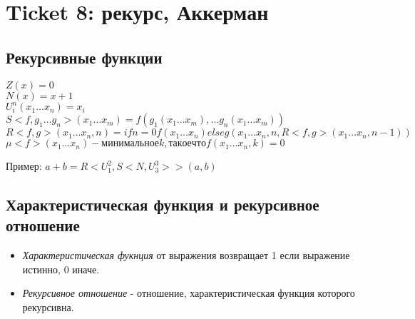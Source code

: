 \section{Ticket 8: рекурс, Аккерман}
\label{sec-10}
\subsection{Рекурсивные функции}
\label{sec-10-1}
$Z(x) = 0$\\
$N(x) = x + 1$\\
$U^n_i(x_1\ldots{}x_n) = x_i$\\
$S<f, g_1\ldots{}g_n>(x_1\ldots{}x_m) = f(g_1(x_1\ldots{}x_m),\ldots{}g_n(x_1\ldots{}x_m))$\\
$R<f, g>(x_1\ldots{}x_n, n) = if n = 0
f(x_1\ldots{}x_n)
else g(x_1\ldots{}x_n, n, R<f, g>(x_1\ldots{}x_n, n - 1))$\\
$μ<f>(x_1\ldots{}x_n) - минимальное k, такое что f(x_1\ldots{}x_n, k) = 0$

Пример:
$a + b = R<U^2_1, S<N, U^3_3>>(a, b)$
\subsection{Характеристическая функция и рекурсивное отношение}
\label{sec-10-2}
\begin{itemize}
\item \emph{Характеристическая фукнция} от выражения возвращает 1 если
выражение истинно, 0 иначе.
\item \emph{Рекурсивное отношение} - отношение, характеристическая функция
которого рекурсивна.
\end{itemize}
